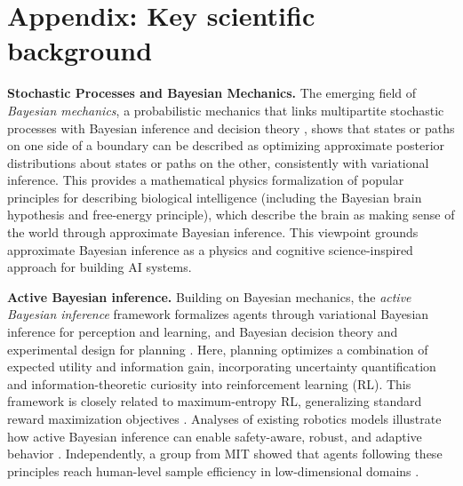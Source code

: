 \documentclass[11pt,letterpaper]{article}
\begin{document}
\appendix

\section*{Appendix: Key scientific background}

\textbf{Stochastic Processes and Bayesian Mechanics.}
The emerging field of \emph{Bayesian mechanics}, a probabilistic mechanics that links multipartite stochastic processes with Bayesian inference and decision theory \cite{da_costa_bayesian_2021,friston_free_2023}, shows that states or paths on one side of a boundary can be described as optimizing approximate posterior distributions about states or paths on the other, consistently with variational inference. This provides a mathematical physics formalization of popular principles for describing biological intelligence (including the Bayesian brain hypothesis and free-energy principle), which describe the brain as making sense of the world through approximate Bayesian inference. This viewpoint grounds approximate Bayesian inference as a physics and cognitive science-inspired approach for building AI systems.

\textbf{Active Bayesian inference.}
Building on Bayesian mechanics, the \emph{active Bayesian inference} framework formalizes agents through variational Bayesian inference for perception and learning, and Bayesian decision theory and experimental design for planning \cite{barp_geometric_2022}. Here, planning optimizes a combination of expected utility and information gain, incorporating uncertainty quantification and information-theoretic curiosity into reinforcement learning (RL). This framework is closely related to maximum-entropy RL, generalizing standard reward maximization objectives \cite{da_costa_reward_2023}. Analyses of existing robotics models illustrate how active Bayesian inference can enable safety-aware, robust, and adaptive behavior \cite{da_costa_how_2022}. Independently, a group from MIT showed that agents following these principles reach human-level sample efficiency in low-dimensional domains \cite{tsividis_human-level_2021}.
\end{document}
